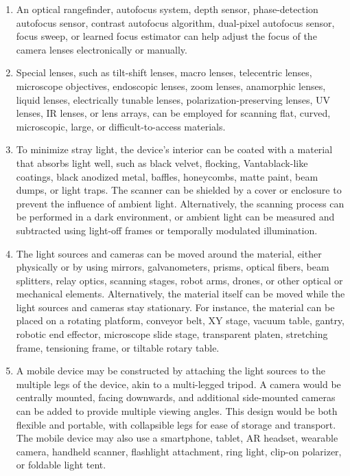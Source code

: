 \documentclass[11pt, twoside, listof=totocnumbered, bibliography=totocnumbered]{scrartcl}
\begin{document}
\begin{enumerate}
		\item An optical rangefinder, autofocus system, depth sensor, phase-detection autofocus sensor, contrast autofocus algorithm, dual-pixel autofocus sensor, focus sweep, or learned focus estimator can help adjust the focus of the camera lenses electronically or manually.
		
		\item Special lenses, such as tilt-shift lenses, macro lenses, telecentric lenses, microscope objectives, endoscopic lenses, zoom lenses, anamorphic lenses, liquid lenses, electrically tunable lenses, polarization-preserving lenses, UV lenses, IR lenses, or lens arrays, can be employed for scanning flat, curved, microscopic, large, or difficult-to-access materials.
		
		\item To minimize stray light, the device's interior can be coated with a material that absorbs light well, such as black velvet, flocking, Vantablack-like coatings, black anodized metal, baffles, honeycombs, matte paint, beam dumps, or light traps. The scanner can be shielded by a cover or enclosure to prevent the influence of ambient light. Alternatively, the scanning process can be performed in a dark environment, or ambient light can be measured and subtracted using light-off frames or temporally modulated illumination.
		
		\item The light sources and cameras can be moved around the material, either physically or by using mirrors, galvanometers, prisms, optical fibers, beam splitters, relay optics, scanning stages, robot arms, drones, or other optical or mechanical elements. Alternatively, the material itself can be moved while the light sources and cameras stay stationary. For instance, the material can be placed on a rotating platform, conveyor belt, XY stage, vacuum table, gantry, robotic end effector, microscope slide stage, transparent platen, stretching frame, tensioning frame, or tiltable rotary table.
		
		\item A mobile device may be constructed by attaching the light sources to the multiple legs of the device, akin to a multi-legged tripod. A camera would be centrally mounted, facing downwards, and additional side-mounted cameras can be added to provide multiple viewing angles. This design would be both flexible and portable, with collapsible legs for ease of storage and transport. The mobile device may also use a smartphone, tablet, AR headset, wearable camera, handheld scanner, flashlight attachment, ring light, clip-on polarizer, or foldable light tent.
		

\end{enumerate}
\end{document}
